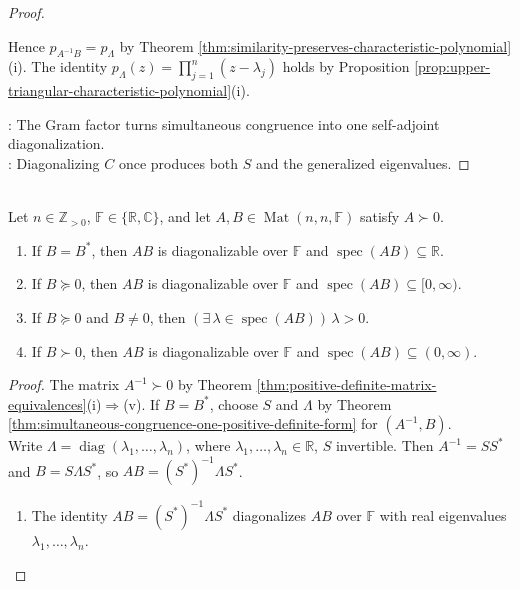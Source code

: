 \begin{theorem}
\begin{proof}
\begin{enumerate}[label=(\roman*)]
Hence $p_{A^{-1}B}=p_{\Lambda}$ by Theorem \ref{thm:similarity-preserves-characteristic-polynomial}(i). The identity $p_{\Lambda}(z)=\prod\limits_{j=1}^{n}(z-\lambda_j)$ holds by Proposition \ref{prop:upper-triangular-characteristic-polynomial}(i).
\end{enumerate}
: The Gram factor turns simultaneous congruence into one self-adjoint diagonalization.\\
: Diagonalizing $C$ once produces both $S$ and the generalized eigenvalues.
\end{proof}
\end{theorem}

\begin{corollary} \label{cor:positive-definite-hermitian-product-spectrum} \\
Let $n\in\mathbb{Z}_{>0}$, $\mathbb{F}\in\{\mathbb{R},\mathbb{C}\}$, and let $A,B\in\operatorname{Mat}(n,n,\mathbb{F})$ satisfy $A\succ0$.
\begin{enumerate}[label=(\roman*)]
\setlength{\itemsep}{0pt}
\item If $B=B^*$, then $AB$ is diagonalizable over $\mathbb{F}$ and $\operatorname{spec}(AB)\subseteq\mathbb{R}$.
\item If $B\succeq0$, then $AB$ is diagonalizable over $\mathbb{F}$ and $\operatorname{spec}(AB)\subseteq[0,\infty)$.
\item If $B\succeq0$ and $B\neq0$, then $(\exists\,\lambda\in\operatorname{spec}(AB))\,\lambda>0$.
\item If $B\succ0$, then $AB$ is diagonalizable over $\mathbb{F}$ and $\operatorname{spec}(AB)\subseteq(0,\infty)$.
\end{enumerate}
\begin{proof}
The matrix $A^{-1}\succ0$ by Theorem \ref{thm:positive-definite-matrix-equivalences}(i)$\Rightarrow$(v). If $B=B^*$, choose $S$ and $\Lambda$ by Theorem \ref{thm:simultaneous-congruence-one-positive-definite-form} for $(A^{-1},B)$.\\
Write $\Lambda=\operatorname{diag}(\lambda_1,\ldots,\lambda_n)$, where $\lambda_1,\ldots,\lambda_n\in\mathbb{R}$, $S$ invertible. Then $A^{-1}=SS^*$ and $B=S\Lambda S^*$, so $AB=(S^*)^{-1}\Lambda S^*$.
\begin{enumerate}[label=(\roman*)]
\setlength{\itemsep}{0pt}
\item The identity $AB=(S^*)^{-1}\Lambda S^*$ diagonalizes $AB$ over $\mathbb{F}$ with real eigenvalues $\lambda_1,\ldots,\lambda_n$.

\end{enumerate}
\end{proof}
\end{corollary}
